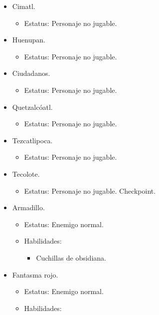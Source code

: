 \begin{itemize}
		\item Cimatl.
			\begin{itemize}
				\item Estatus: Personaje no jugable.		
			\end{itemize}
		\item Huenupan.
			\begin{itemize}
				\item Estatus: Personaje no jugable.		
			\end{itemize}
		\item Ciudadanos.
			\begin{itemize}
				\item Estatus: Personaje no jugable.		
			\end{itemize}
		\item Quetzalcóatl.
			\begin{itemize}
				\item Estatus: Personaje no jugable.		
			\end{itemize}
		\item Tezcatlipoca.
			\begin{itemize}
				\item Estatus: Personaje no jugable.		
			\end{itemize}
		\item Tecolote.
			\begin{itemize}
				\item Estatus: Personaje no jugable. Checkpoint.		
			\end{itemize}
		\item Armadillo.
			\begin{itemize}
				\item Estatus: Enemigo normal. 
				\item Habilidades: 
					\begin{itemize}
						\item Cuchillas de obsidiana.			
					\end{itemize}
			\end{itemize}
		\item Fantasma rojo.
			\begin{itemize}
				\item Estatus: Enemigo normal. 
				\item Habilidades: 

\end{itemize}
\end{itemize}
